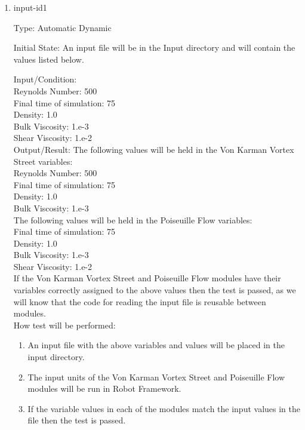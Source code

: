 \documentclass[12pt, titlepage]{article}
\begin{document}
\begin{enumerate}

\item{input-id1\\}

Type: Automatic Dynamic
					
Initial State: An input file will be in the Input directory and will contain the values listed below.
					
Input/Condition:\\
Reynolds Number: 500\\
Final time of simulation: 75\\
Density: 1.0\\
Bulk Viscosity: 1.e-3\\
Shear Viscosity: 1.e-2\\
					
Output/Result: The following values will be held in the Von Karman Vortex Street variables:\\
Reynolds Number: 500\\
Final time of simulation: 75\\
Density: 1.0\\
Bulk Viscosity: 1.e-3\\
The following values will be held in the Poiseuille Flow variables:\\
Final time of simulation: 75\\
Density: 1.0\\
Bulk Viscosity: 1.e-3\\
Shear Viscosity: 1.e-2\\


If the Von Karman Vortex Street and Poiseuille Flow modules have their variables correctly assigned to the above values then the test is passed, as we will know that the code for reading the input file is reusable between modules.\\

	
How test will be performed:

\begin{enumerate}
\item An input file with the above variables and values will be placed in the input directory.
\item The input units of the Von Karman Vortex Street and Poiseuille Flow modules will be run in Robot Framework.
\item If the variable values in each of the modules match the input values in the file then the test is passed.
\end{enumerate}
					

\end{enumerate}
\end{document}
